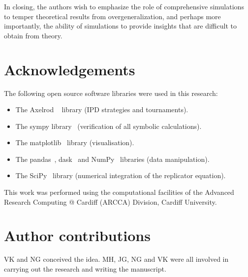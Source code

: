 \documentclass[a4paper]{article}
\begin{document}
In closing, the authors wish to emphasize the role of comprehensive simulations to temper
theoretical results from overgeneralization, and perhaps more importantly, the
ability of simulations to provide insights that are difficult to obtain from theory.

\section*{Acknowledgements}

The following open source software libraries were used in this research:

\begin{itemize}
    \item The Axelrod ~\cite{Knight2016, Knight2018} library (IPD strategies and
        tournaments).
    \item The sympy library~\cite{Meurer2017} (verification of all symbolic
        calculations).
    \item The matplotlib~\cite{Droettboom2018} library (visualisation).
    \item The pandas~\cite{Structures2010}, dask~\cite{Dask2016} and
        NumPy~\cite{Oliphant2015} libraries (data manipulation).
    \item The SciPy~\cite{Jones2001} library (numerical integration of the
        replicator equation).
\end{itemize}

This work was performed using the computational facilities of the Advanced
Research Computing @ Cardiff (ARCCA) Division, Cardiff University.

\section*{Author contributions}

VK and NG conceived the idea. MH, JG, NG and VK were all involved in carrying
out the research and writing the manuscript.

\printbibliography




\end{document}
